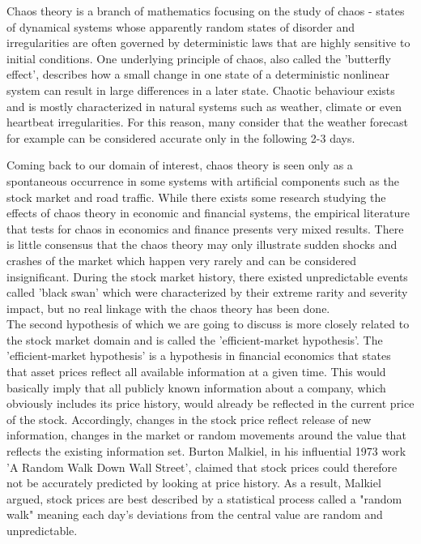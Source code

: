 Chaos theory is a branch of mathematics focusing on the study of chaos - states of dynamical systems whose apparently random states of disorder and irregularities are often governed by deterministic laws that are highly sensitive to initial conditions. One underlying principle of chaos, also called the 'butterfly effect', describes how a small change in one state of a deterministic nonlinear system can result in large differences in a later state. Chaotic behaviour exists and is mostly characterized in natural systems such as weather, climate or even heartbeat irregularities. For this reason, many consider that the weather forecast for example can be considered accurate only in the following 2-3 days.

Coming back to our domain of interest, chaos theory is seen only as a spontaneous occurrence in some systems with artificial components such as the stock market and road traffic. While there exists some research studying the effects of chaos theory in economic and financial systems, the empirical literature that tests for chaos in economics and finance presents very mixed results.\cite{brooks1998chaos} There is little consensus that the chaos theory may only illustrate sudden shocks and crashes of the market which happen very rarely and can be considered insignificant. During the stock market history, there existed unpredictable events called 'black swan' which were characterized by their extreme rarity and severity impact, but no real linkage with the chaos theory has been done.\\

The second hypothesis of which we are going to discuss is more closely related to the stock market domain and is called the 'efficient-market hypothesis'. The 'efficient-market hypothesis' is a hypothesis in financial economics that states that asset prices reflect all available information at a given time. This would basically imply that all publicly known information about a company, which obviously includes its price history, would already be reflected in the current price of the stock. Accordingly, changes in the stock price reflect release of new information, changes in the market or random movements around the value that reflects the existing information set. Burton Malkiel, in his influential 1973 work 'A Random Walk Down Wall Street', claimed that stock prices could therefore not be accurately predicted by looking at price history. As a result, Malkiel argued, stock prices are best described by a statistical process called a "random walk" meaning each day's deviations from the central value are random and unpredictable.


